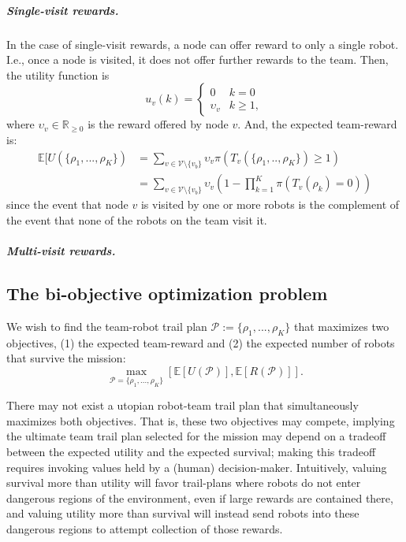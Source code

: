 \documentclass[11pt, oneside]{article}
\begin{document}
\subparagraph{Single-visit rewards.}
In the case of single-visit rewards, a node can offer reward to only a single robot. I.e., once a node is visited, it does not offer further rewards to the team. Then, the utility function is
\begin{equation}
	u_v(k) = \begin{cases}
		0 & k = 0 \\
		\upsilon_v & k \geq 1,
	\end{cases}
\end{equation} where $\upsilon_v \in \mathbb{R}_{\geq 0}$ is the reward offered by node $v$. And, the expected team-reward is:
\begin{align}
	\mathbb{E}[U(\{\rho_1, ..., \rho_K\}) & = \sum_{v \in \mathcal{V} \setminus \{v_b\}} \upsilon_v \pi(T_v(\{\rho_1, .., \rho_K\}) \geq 1) \\
		      & = \sum_{v \in \mathcal{V} \setminus \{v_b\}} \upsilon_v \left(1 - \prod_{k=1}^K  \pi(T_v(\rho_k) =0) \right)
\end{align} since the event that node $v$ is visited by one or more robots is the complement of the event that none of the robots on the team visit it.

\subparagraph{Multi-visit rewards.}

\subsection{The bi-objective optimization problem}
We wish to find the team-robot trail plan $\mathcal{P}:=\{\rho_1, ..., \rho_K\}$ that maximizes two objectives, (1) the expected team-reward and (2) the expected number of robots that survive the mission:
\begin{equation}
\max_{\mathcal{P}=\{\rho_1, ..., \rho_K\}} [\mathbb{E}[U(\mathcal{P})], \mathbb{E}[R(\mathcal{P})]].
\label{eq:the_two_objs}
\end{equation}

There may not exist a utopian robot-team trail plan that simultaneously maximizes both objectives. 
That is, these two objectives may compete, implying the ultimate team trail plan selected for the mission may depend on a tradeoff between the expected utility and the expected survival; making this tradeoff requires invoking values held by a (human) decision-maker. Intuitively, valuing survival more than utility will favor trail-plans where robots do not enter dangerous regions of the environment, even if large rewards are contained there, and valuing utility more than survival will instead send robots into these dangerous regions to attempt collection of those rewards. 
\end{document}
